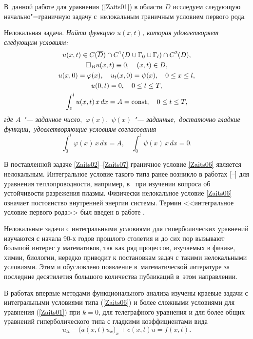 В~данной работе для уравнения (\ref{Zaits01}) в области $D$ исследуем следующую начально"=граничную задачу с~нелокальным граничным условием первого рода.

\smallskip

{\small\sc Нелокальная задача.} \it Найти функцию $u(x,t)$, которая удовлетворяет следующим условиям{\rm:}
\begin{gather}
\label{Zaits02}
u(x,t)\in C(\overline{D})\cap C^1(D\cup \Gamma_0\cup \Gamma_l)\cap C^2(D),
\\
\label{Zaits03}
\Box_Bu(x,t)\equiv 0,\quad (x,t)\in D,
\\
\label{Zaits04}
u(x, 0)=\varphi(x),\quad u_t(x, 0)=\psi(x),\quad 0\leq x\leq l,
\\
\label{Zaits05}
u(0,t)=0,\quad 0\leq t\leq T,
\\
\label{Zaits06}
 \int _0^l{u(x,t)\,x\,dx}=A={\rm const},\quad 0\leq t\leq T,
\end{gather}
где $A$ "--- заданное число$,$ $\varphi(x),$ $\psi(x)$ "--- заданные$,$ достаточно гладкие функции$,$ удовлетворяющие условиям согласования
\begin{equation}
\label{Zaits07}
 \int _0^l{\varphi(x)\,x\,dx}=A,\quad  \int _0^l{\psi(x)\,x\,dx}=0.
\end{equation}

\rm
\smallskip

В поставленной задаче \eqref{Zaits02}--\eqref{Zaits07} граничное условие \eqref{Zaits06} является нелокальным. Интегральное условие такого типа ранее возникло в работах [--] для уравнения теплопроводности, например, в~\cite{Zaitseva:Ionk} при изучении вопроса об устойчивости разрежения плазмы. Физически нелокальное условие \eqref{Zaits06} означает постоянство внутренней энергии системы. 
Термин <<интегральное условие первого рода>> был введен в работе \cite{Zaitseva:PulkLS1}.

Нелокальные задачи с интегральными условиями для гиперболических уравнений изучаются с начала 90-х годов прошлого столетия и до сих пор вызывают большой интерес у математиков, так как ряд процессов, изучаемых в физике, химии, биологии, нередко приводит к постановкам задач с такими нелокальными условиями. Этим и обусловлено появление в~математической литературе за последние десятилетия большого количества публикаций в~этом направлении.

В работах \cite{Zaitseva:PulkLS2,Zaitseva:PulkLS3} впервые методами функционального анализа изучены краевые задачи с интегральными условиями типа (\ref{Zaits06}) и более сложными условиями для уравнения (\ref{Zaits01}) при $k=0$, для телеграфного уравнения и для более общих уравнений гиперболического типа с гладкими коэффициентами вида
$$u_{tt}-\bigl(a(x,t)u_x\bigr)_x+c(x,t)u=f(x,t).$$

